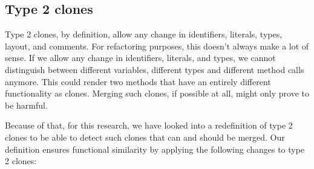 \documentclass[a4paper]{article}
\begin{document}
\subsection{Type 2 clones}
Type 2 clones, by definition, allow any change in identifiers, literals, types, layout, and comments. For refactoring purposes, this doesn't always make a lot of sense. If we allow any change in identifiers, literals, and types, we cannot distinguish between different variables, different types and different method calls anymore. This could render two methods that have an entirely different functionality as clones. Merging such clones, if possible at all, might only prove to be harmful.

Because of that, for this research, we have looked into a redefinition of type 2 clones to be able to detect such clones that can and should be merged. Our definition ensures functional similarity by applying the following changes to type 2 clones:
\end{document}

